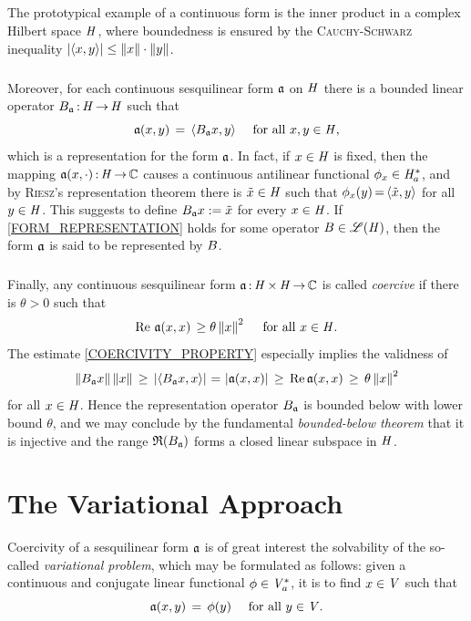 \documentclass[11pt,twoside]{article}
\begin{document}
\subparagraph*{} %
The prototypical example of a continuous form is
the inner product in a complex Hilbert space $\mathit{H}$,
where boundedness is ensured by the \textsc{Cauchy-Schwarz} inequality
$\abs{ \scalar{x}{y} } \leq \norm{x} \cdot \norm{y}$.

\subparagraph*{}
Moreover,
for each continuous sesquilinear form $\mathfrak{a}$ on $\mathit{H}$
there is a bounded linear operator ${B}_{\mathfrak{a}}{\,:\,}\mathit{H} {\,\to\,} \mathit{H}$
such that
\begin{equation}\label{FORM_REPRESENTATION}
\mathfrak{a}(x,y) \,=\, \langle {B}_{\mathfrak{a}} x,y \rangle \quad \mbox{ for all } x,y \in \mathit{H},
\end{equation}
which is a representation for the form $\mathfrak{a}$.
In fact,
if $x \in \mathit{H}$ is fixed,
then the mapping $\mathfrak{a}(x,\cdot){\,:\,}\mathit{H} {\,\to\,} {\mathbb{C}}$
causes a continuous antilinear functional $\phi_x \in \mathit{H}_a^*$,
and by \textsc{Riesz}'s representation theorem
there is $\tilde{x} \in \mathit{H}$ such that
$\phi_x(y) {\,=\,} \langle \tilde{x},y \rangle$ for all $y \in \mathit{H}$.
This suggests to define ${B}_{\mathfrak{a}} x := \tilde{x}$ for every $x \in \mathit{H}$.
If \eqref{FORM_REPRESENTATION} holds for some operator ${B} \in \mathscr{L}(\mathit{H})$,
then the form $\mathfrak{a}$ is said to be represented by ${B}$.

\subparagraph*{} %
Finally,
any continuous sesquilinear form $\mathfrak{a}{\,:\,}\mathit{H} {\,\times\,} \mathit{H} {\,\to\,} {\mathbb{C}}$
is called \textit{coercive}
if there is $\theta > 0$ such that
\begin{equation}\label{COERCIVITY_PROPERTY}
\operatorname{Re} \, \mathfrak{a}(x,x) \, \geq \theta \left\lVert x \right\rVert^2
\quad \mbox{ for all } x \in \mathit{H}.
\end{equation}
The estimate \eqref{COERCIVITY_PROPERTY} especially implies the validness of
\[
\norm{\linB_{\sql} x}\norm{x}    \, \geq \,
\abs{\scalar{\linB_{\sql} x}{x}} \, \eq  \,
\abs{\sql(x,x)}                  \, \geq \,
\re \sql(x,x)                    \, \geq \,
\theta \norm{x}^2
\]
for all $x \in \mathit{H}$.
Hence the representation operator ${B}_{\mathfrak{a}}$ is bounded below
with lower bound $\theta$,
and we may conclude by the fundamental \textit{bounded-below theorem}
that it is injective and the range $\mathfrak{R}({B}_{\mathfrak{a}})$
forms a closed linear subspace in $\mathit{H}$.

\section{The Variational Approach}                                             %
Coercivity of a sesquilinear form $\mathfrak{a}$ is of great interest {\wrt}
the solvability of the so-called \textit{variational problem},
which may be formulated as follows:
given a continuous and conjugate linear functional $\phi \in \mathit{V}_a^*$,
it is to find $x \in \mathit{V}$ such that
\begin{equation}\label{VARIATIONAL_EQUATION}
\mathfrak{a}(x,y) \,=\, \phi(y) \quad \mbox{ for all } y \in \mathit{V}.
\end{equation}
\end{document}
